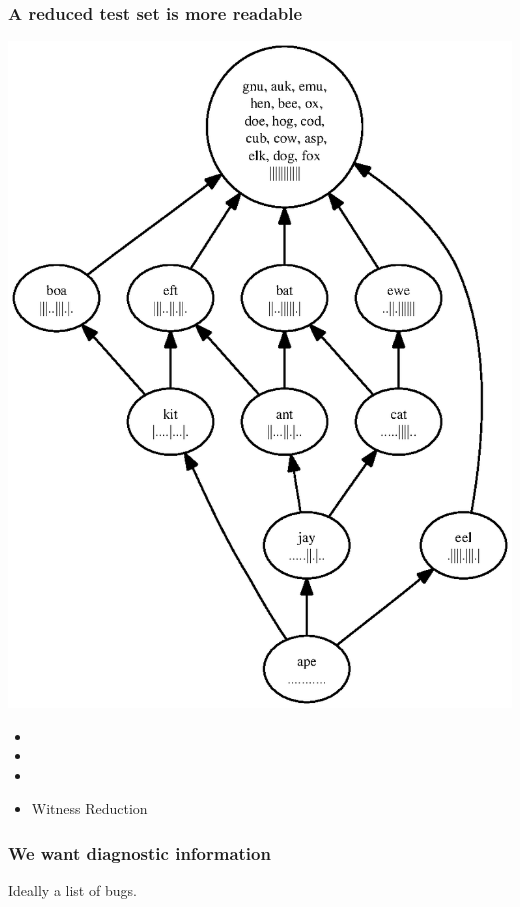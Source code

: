 \documentclass[svgnames,14pt]{beamer}
\theoremstyle{definition}
\begin{document}
\begin{frame}
\frametitle{A reduced test set is more readable}
\centerline{\includegraphics[height=0.9\textheight]{success.ps}}
\end{frame}

\begin{frame}
\begin{itemize}
\frametitle{Overview}
\item {}
\item {}
\item {}
\item Witness Reduction
\end{itemize}
\end{frame}

\begin{frame}
\frametitle{We want diagnostic information}
Ideally a list of bugs.

\bigskip

\end{frame}
\end{document}
